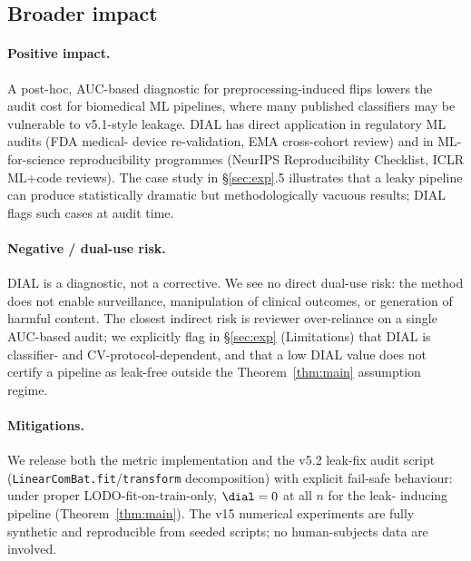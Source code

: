 %


\subsection{Broader impact}

\paragraph{Positive impact.}
A post-hoc, AUC-based diagnostic for preprocessing-induced flips
lowers the audit cost for biomedical ML pipelines, where many
published classifiers may be vulnerable to v5.1-style leakage.
DIAL has direct application in regulatory ML audits (FDA medical-
device re-validation, EMA cross-cohort review) and in ML-for-science
reproducibility programmes (NeurIPS Reproducibility Checklist, ICLR
ML+code reviews). The case study in \S\ref{sec:exp}.5 illustrates
that a leaky pipeline can produce statistically dramatic but
methodologically vacuous results; DIAL flags such cases at audit
time.

\paragraph{Negative / dual-use risk.}
DIAL is a diagnostic, not a corrective. We see no direct dual-use
risk: the method does not enable surveillance, manipulation of
clinical outcomes, or generation of harmful content. The closest
indirect risk is reviewer over-reliance on a single AUC-based
audit; we explicitly flag in \S\ref{sec:exp} (Limitations) that
DIAL is classifier- and CV-protocol-dependent, and that a low
DIAL value does not certify a pipeline as leak-free outside the
Theorem~\ref{thm:main} assumption regime.

\paragraph{Mitigations.}
We release both the metric implementation and the v5.2 leak-fix
audit script (\texttt{LinearComBat.fit}/\texttt{transform}
decomposition) with explicit fail-safe behaviour: under proper
LODO-fit-on-train-only, $\dial = 0$ at all $n$ for the leak-
inducing pipeline (Theorem~\ref{thm:main}). The v15 numerical
experiments are fully synthetic and reproducible from seeded
scripts; no human-subjects data are involved.

